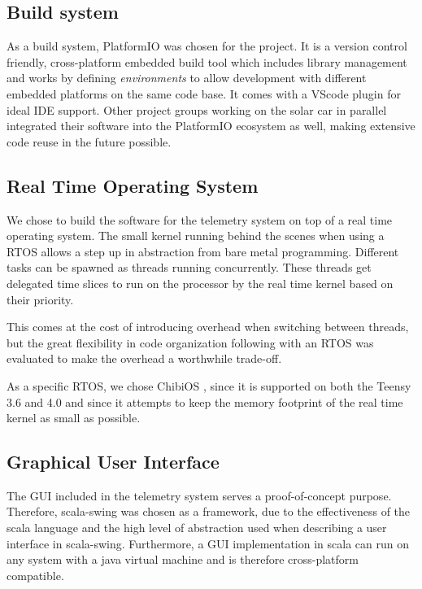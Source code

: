 \documentclass[conference]{IEEEtran}
\begin{document}
\subsection{Build system}
As a build system, PlatformIO \cite{platformIO} was chosen for the project. It is a version control friendly, cross-platform embedded build tool which includes library management and works by defining \textit{environments} to allow development with different embedded platforms on the same code base. It comes with a VScode plugin for ideal IDE support. Other project groups working on the solar car in parallel integrated their software into the PlatformIO ecosystem as well, making extensive code reuse in the future possible.

\subsection{Real Time Operating System}
We chose to build the software for the telemetry system on top of a real time operating system. The small kernel running behind the scenes when using a RTOS allows a step up in abstraction from bare metal programming. Different tasks can be spawned as threads running concurrently. These threads get delegated time slices to run on the processor by the real time kernel based on their priority. 

This comes at the cost of introducing overhead when switching between threads, but the great flexibility in code organization following with an RTOS was evaluated to make the overhead a worthwhile trade-off.

As a specific RTOS, we chose ChibiOS \cite{chibios}, since it is supported on both the Teensy 3.6 and 4.0 and since it attempts to keep the memory footprint of the real time kernel as small as possible.

\subsection{Graphical User Interface} %

The GUI included in the telemetry system serves a proof-of-concept purpose. Therefore, scala-swing \cite{scala-swing} was chosen as a framework, due to the effectiveness of the scala \cite{scala} language and the high level of abstraction used when describing a user interface in scala-swing. Furthermore, a GUI implementation in scala can run on any system with a java virtual machine and is therefore cross-platform compatible.
\end{document}
